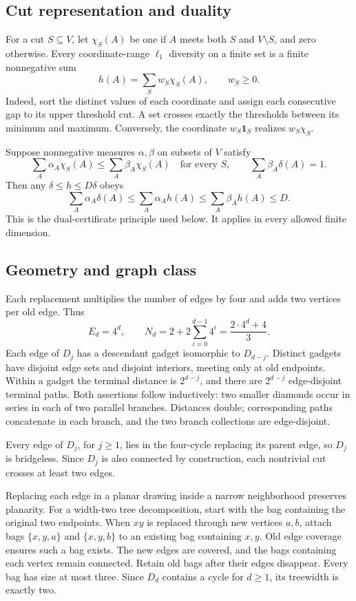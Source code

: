 \documentclass[11pt]{article}
\newcommand{\cut}{\chi}
\begin{document}
\subsection{Cut representation and duality}
For a cut $S\subseteq V$, let $\cut_S(A)$ be one if $A$ meets both $S$ and
$V\setminus S$, and zero otherwise. Every coordinate-range $\ell_1$ diversity
on a finite set is a finite nonnegative sum
\[
h(A)=\sum_S w_S\cut_S(A),\qquad w_S\ge0.
\]
Indeed, sort the distinct values of each coordinate and assign each
consecutive gap to its upper threshold cut. A set crosses exactly the
thresholds between its minimum and maximum. Conversely, the coordinate
$w_S\mathbf1_S$ realizes $w_S\cut_S$.

Suppose nonnegative measures $\alpha,\beta$ on subsets of $V$ satisfy
\begin{equation}\label{eq:dual}
\sum_A\alpha_A\cut_S(A)\le\sum_A\beta_A\cut_S(A)
\quad\text{for every }S,\qquad
\sum_A\beta_A\delta(A)=1.
\end{equation}
Then any $\delta\le h\le D\delta$ obeys
\[
\sum_A\alpha_A\delta(A)\le\sum_A\alpha_Ah(A)
\le\sum_A\beta_Ah(A)\le D.
\]
This is the dual-certificate principle used below. It applies in every
allowed finite dimension.

\subsection{Geometry and graph class}
Each replacement multiplies the number of edges by four and adds two
vertices per old edge. Thus
\[
E_d=4^d,\qquad N_d=2+2\sum_{i=0}^{d-1}4^i=\frac{2\cdot4^d+4}{3}.
\]
Each edge of $D_j$ has a descendant gadget isomorphic to $D_{d-j}$.
Distinct gadgets have disjoint edge sets and disjoint interiors, meeting
only at old endpoints. Within a gadget the terminal distance is $2^{d-j}$,
and there are $2^{d-j}$ edge-disjoint terminal paths. Both assertions follow
inductively: two smaller diamonds occur in series in each of two parallel
branches. Distances double; corresponding paths concatenate in each branch,
and the two branch collections are edge-disjoint.

Every edge of $D_j$, for $j\ge1$, lies in the four-cycle replacing its
parent edge, so $D_j$ is bridgeless. Since $D_j$ is also connected by
construction, each nontrivial cut crosses at least two edges.

Replacing each edge in a planar drawing inside a narrow neighborhood
preserves planarity. For a width-two tree decomposition, start with the
bag containing the original two endpoints. When $xy$ is replaced through
new vertices $a,b$, attach bags $\{x,y,a\}$ and $\{x,y,b\}$ to an existing
bag containing $x,y$. Old edge coverage ensures such a bag exists. The new
edges are covered, and the bags containing each vertex remain connected.
Retain old bags after their edges disappear. Every bag has size at most
three. Since $D_d$ contains a cycle for $d\ge1$, its treewidth is exactly two.
\end{document}
